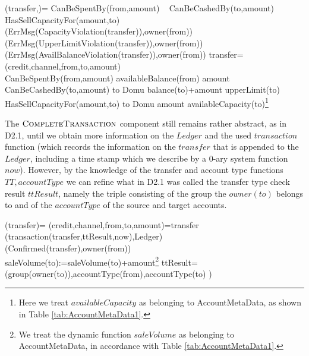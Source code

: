 \begin{asm}
(transfer,)=\+
   \IF CanBeSpentBy(from,amount) \+
      \THEN ~ \IF CanBeCashedBy(to,amount) \+
         \THEN ~ \IF HasSellCapacityFor(amount,to) \+
            \THEN ~  \-
            \ELSE 
             ~ (ErrMsg(CapacityViolation(transfer)),\TO owner(from))\-
         \ELSE 
         ~ (ErrMsg(UpperLimitViolation(transfer)),\TO owner(from))\-
      \ELSE 
      ~ (ErrMsg(AvailBalanceViolation(transfer)),\TO owner(from))\-
      \WHERE \+
transfer=(credit,channel,from,to,amount)\\
CanBeSpentBy(from,amount) \IFF availableBalance(from) \geq amount \\
CanBeCashedBy(to,amount) \IFF  
    to \not \in Domu \AND balance(to)+amount \leq upperLimit(to) \\
 HasSellCapacityFor(amount,to) \IFF  to \not \in Domu \AND   amount \leq availableCapacity(to)\footnote{Here we treat $availableCapacity$ as belonging to AccountMetaData, as shown in Table \ref{tab:AccountMetaData1}.}
\end{asm}


The $\hbox{\sc CompleteTransaction}$ component still remains rather abstract, as in D2.1, until we obtain more information on the $Ledger$ and the used  $transaction$ function (which records the information on the $transfer$ that is appended to the $Ledger$, including a time stamp which we describe by a 0-ary system function $now$). However, by the knowledge of the transfer and account type functions $TT, accountType$ we can refine what in D2.1 was called the transfer type check result $ttResult$, namely the triple consisting of the group the $owner(to)$ belongs to and of the $accountType$ of the source and target accounts.

\begin{asm}
(transfer)=\+  
\LET (credit,channel,from,to,amount)=transfer \\ 
   (transaction(transfer,ttResult,now),Ledger)\\
   (Confirmed(transfer),\TO owner(from))\\
   saleVolume(to):=saleVolume(to)+amount\footnote{We treat the dynamic function $saleVolume$ as belonging to AccountMetaData, in accordance with Table \ref{tab:AccountMetaData1}.} \-
\WHERE \+
 ttResult= (group(owner(to)),accountType(from),accountType(to) )
\end{asm}


